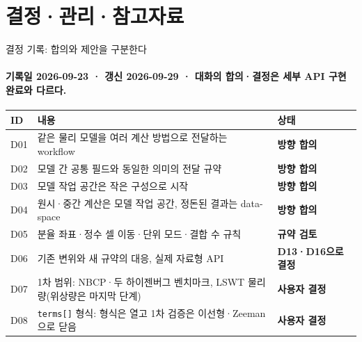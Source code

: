 \section[부록 B. 결정·관리·참고자료]{결정·관리·참고자료}

\begin{frame}[plain,label=section-appendix-b]
  \hypertarget{appendix-b}{}
  \renewcommand{\insertsectionnumber}{B}
  \sectionpage
\end{frame}

\begin{frame}[label=decisions]{결정 기록: 합의와 제안을 구분한다}
  \framesubtitle{기록일 2026-09-23 · 갱신 2026-09-29 · 대화의 합의·결정은 세부 API 구현 완료와 다르다.}
  \small\renewcommand{\arraystretch}{1.12}
  \begin{tabularx}{\textwidth}{@{}p{0.7cm}YP{2.5cm}@{}}
    \toprule
    ID & 내용 & 상태 \\
    \midrule
    D01 & 같은 물리 모델을 여러 계산 방법으로 전달하는 workflow & \textbf{방향 합의} \\
    D02 & 모델 간 공통 필드와 동일한 의미의 전달 규약 & \textbf{방향 합의} \\
    D03 & 모델 작업 공간은 작은 구성으로 시작 & \textbf{방향 합의} \\
    D04 & 원시·중간 계산은 모델 작업 공간, 정돈된 결과는 data-space & \textbf{방향 합의} \\
    D05 & 분율 좌표·정수 셀 이동·단위 모드·결합 수 규칙 & \textbf{규약 검토} \\
    D06 & 기존 변위와 새 규약의 대응, 실제 자료형 API & \textbf{D13·D16으로 결정} \\
    D07 & 1차 범위: NBCP·두 하이젠버그 벤치마크, LSWT 물리량(위상량은 마지막 단계) & \textbf{사용자 결정} \\
    D08 & \texttt{terms[]} 형식: 형식은 열고 1차 검증은 이선형·Zeeman으로 닫음 & \textbf{사용자 결정} \\
\bottomrule
  \end{tabularx}
  \par\smallskip
\end{frame}

